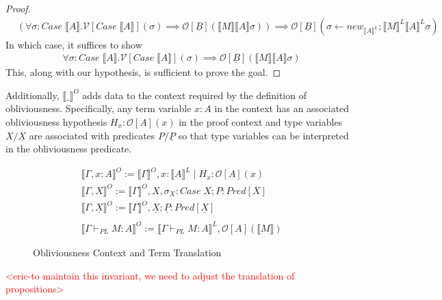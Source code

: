 \documentclass[acmsmall]{acmart}
\newcommand{\den}[1]{\llbracket #1\rrbracket}
\newcommand{\eric}[1]{\textcolor{red}{ <eric-#1> }}
\begin{document}
\begin{proof}
\begin{align*}
  &(\forall \sigma : Case\;\den{A}. \mathcal{V}[Case\;\den{A}](\sigma) \implies \mathcal{O}[\underline{B}](\den{M}\den{A}\sigma)) \implies\mathcal{O}[\underline{B}](\sigma \leftarrow new_{\den{A}^L};\den{M}^L\den{A}^L\sigma)
\end{align*}
In which case, it suffices to show
\begin{align*}
  &\forall \sigma : Case\;\den{A}. \mathcal{V}[Case\;\den{A}](\sigma) \implies \mathcal{O}[\underline{B}](\den{M}\den{A}\sigma)
\end{align*}
This, along with our hypothesis, is sufficient to prove the goal.

\end{proof}


Additionally, $\den{\_}^O$ adds data to the context required by the definition of obliviousness. Specifically, any term variable $x :A$ in the context has an associated obliviousness hypothesis $H_x : \mathcal{O}[A](x)$ in the proof context and type variables $X/\underline{X}$ are associated with predicates $P/\underline{P}$ so that type variables can be interpreted in the obliviousness predicate.


\begin{figure}[H]
  \centering
  \scriptsize
  \begin{align*} 
    &\den{\Gamma,x:A}^O := \den{\Gamma}^O,x : \den{A}^L \;|\; H_x : \mathcal{O}[A](x)\\
    &\den{\Gamma,X}^O := \den{\Gamma}^O,X,\sigma_X : Case\;X ; P : Pred[X]\\
    &\den{\Gamma,\underline{X}}^O := \den{\Gamma}^O,\underline{X}; \underline{P} : Pred[\underline{X}]\\
    \\
    &\den{\Gamma \vdash_{PL} M : A}^O := \den{\Gamma \vdash_{PL} M : A}^L, \mathcal{O}[A](\den{M}) 
  \end{align*}
  \caption{Obliviousness Context and Term Translation}
  \label{fig:d}
\end{figure}
\eric{to maintain this invariant, we need to adjust the translation of propositions}
\end{document}
